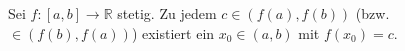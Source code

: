 Sei $f: [a, b] \to \mathbb{R}$ stetig. Zu jedem $c \in (f(a), f(b))$ (bzw. $\in (f(b), f(a))$) existiert ein $x_0 \in (a, b)$ mit $f(x_0) = c$.